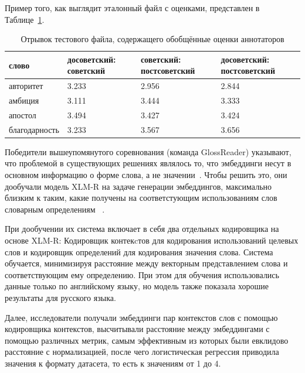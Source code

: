 \documentclass[LI,VKR]{HSEUniversity}
\begin{document}
Пример того, как выглядит эталонный файл с оценками, представлен в Таблице~\ref{tab:goldset_rushifteval}.

\begin{table}[H]
\centering
\caption{Отрывок тестового файла, содержащего обобщённые оценки аннотаторов}
\label{tab:goldset_rushifteval}
\begin{tabular}{|l|p{2.75cm}|p{2.75cm}|p{2.75cm}|}
\hline
\textbf{слово} & \textbf{досоветский: советский} & \textbf{советский: постсоветский} & \textbf{досоветский: постсоветский} \\
\hline
авторитет & 3.233 & 2.956 & 2.844 \\
\hline
амбиция & 3.111 & 3.444 & 3.333 \\
\hline
апостол & 3.494 & 3.427 & 3.424 \\
\hline
благодарность & 3.233 & 3.567 & 3.656 \\
\hline
\end{tabular}
\end{table}

Победители вышеупомянутого соревнования (команда GlossReader) указывают,
что проблемой в существующих решениях являлось то,
что эмбеддинги несут в основном информацию о форме слова, а не значении~\cite{GlossReader}.
Чтобы решить это, они дообучали модель XLM-R на задаче генерации эмбеддингов, максимально близким
к таким, какие получены на соответстующим использованиям слов словарным определениям
~\cite{XLM-R}.

При дообучении их система включает в себя два отдельных кодировщика на основе XLM-R:
Кодировщик контекcтов для кодирования использований целевых слов и
кодировщик определений для кодирования значения слова.
Система обучается, минимизируя расстояние между векторным представлением слова и соответствующим ему
определению.
При этом для обучения использовались данные только по английскому языку,
но модель также показала хорошие результаты для русского языка.

Далее, исследователи получали эмбеддинги пар контекстов слов с помощью
кодировщика контекстов, высчитывали расстояние между эмбеддингами с помощью различных метрик,
самым эффективным из которых были евклидово расстояние с нормализацией, после чего
логистическая регрессия приводила значения к формату датасета, то есть к значениям от 1 до 4.

\end{document}
